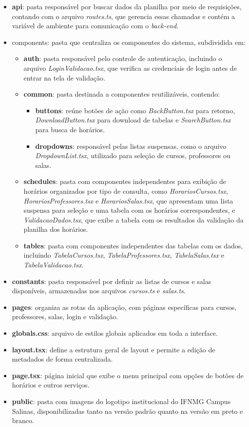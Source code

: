 \begin{itemize}
    \item \textbf{api}: pasta responsável por buscar dados da planilha por meio de requisições, contando com o arquivo \textit{routes.ts}, que gerencia essas chamadas e contém a variável de ambiente para comunicação com o \textit{back-end}.
    \item components: pasta que centraliza os componentes do sistema, subdividida em:
    \begin{itemize}
        \item \textbf{auth}: pasta responsável pelo controle de autenticação, incluindo o arquivo \textit{LoginValidacao.tsx}, que verifica as credenciais de login antes de entrar na tela de validação.
        \item \textbf{common}: pasta destinada a componentes reutilizáveis, contendo:
        \begin{itemize}
            \item \textbf{buttons}: reúne botões de ação como \textit{BackButton.tsx} para retorno, \textit{DownloadButton.tsx} para download de tabelas e \textit{SearchButton.tsx} para busca de horários.
             \item \textbf{dropdowns}: responsável pelas listas suspensas, como o arquivo \textit{DropdownList.tsx}, utilizado para seleção de cursos, professores ou salas.
        \end{itemize}
        \item \textbf{schedules}: pasta com componentes independentes para exibição de horários organizados por tipo de consulta, como \textit{HorariosCursos.tsx}, \textit{HorariosProfessores.tsx} e \textit{HorariosSalas.tsx}, que apresentam uma lista suspensa para seleção e uma tabela com os horários correspondentes, e \textit{ValidacaoDados.tsx}, que exibe a tabela com os resultados da validação da planilha dos horários.
        \item \textbf{tables}: pasta com componentes independentes das tabelas com os dados, incluindo \textit{TabelaCursos.tsx}, \textit{TabelaProfessores.tsx}, \textit{TabelaSalas.tsx} e \textit{TabelaValidacao.tsx}.
    \end{itemize}
    \item \textbf{constants}: pasta responsável por definir as listas de cursos e salas disponíveis, armazenadas nos arquivos \textit{cursos.ts} e \textit{salas.ts}.
    \item \textbf{pages}: organiza as rotas da aplicação, com páginas específicas para cursos, professores, salas, login e validação.
    \item \textbf{globals.css}: arquivo de estilos globais aplicados em toda a interface.
    \item \textbf{layout.tsx}: define a estrutura geral de layout e permite a edição de metadados de forma centralizada.
    \item \textbf{page.tsx}: página inicial que exibe o menu principal com opções de botões de horários e outros serviços.
    \item \textbf{public}: pasta com imagens do logotipo institucional do IFNMG Campus Salinas, disponibilizadas tanto na versão padrão quanto na versão em preto e branco.
\end{itemize}

